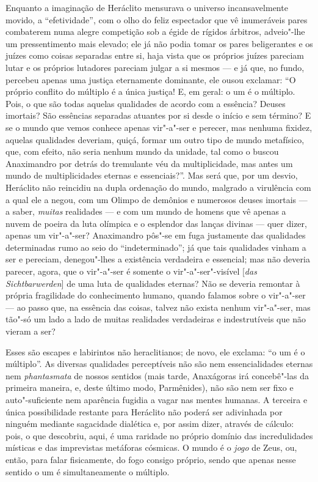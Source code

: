 Enquanto a imaginação de Heráclito mensurava o universo incansavelmente
movido, a ``efetividade'', com o olho do feliz espectador que vê inumeráveis
pares combaterem numa alegre competição sob a égide de rígidos árbitros,
adveio"-lhe um pressentimento mais elevado; ele já não podia tomar os pares
beligerantes e os juízes como coisas separadas entre si, haja vista que os
próprios juízes pareciam lutar e os próprios lutadores pareciam julgar a si
mesmos --- e já que, no fundo, percebeu apenas uma justiça eternamente
dominante, ele ousou exclamar: ``O próprio conflito do múltiplo é a única
justiça! E, em geral: o um é o múltiplo. Pois, o que são todas aquelas
qualidades de acordo com a essência? Deuses imortais? São essências separadas
atuantes por si desde o início e sem término? E se o mundo que vemos conhece
apenas vir"-a"-ser e perecer, mas nenhuma fixidez, aquelas qualidades
deveriam, quiçá, formar um outro tipo de mundo metafísico, que, com efeito,
não seria nenhum mundo da unidade, tal como o buscou Anaximandro por detrás
do tremulante véu da multiplicidade, mas antes um mundo de multiplicidades
eternas e essenciais?''. Mas será que, por um desvio, Heráclito não reincidiu
na dupla ordenação do mundo, malgrado a virulência com a qual ele a negou,
com um Olimpo de demônios e numerosos deuses imortais --- a saber, \textit{muitas} 
realidades --- e com um mundo de homens que vê apenas a nuvem de
poeira da luta olímpica e o esplendor das lanças divinas --- quer dizer,
apenas um vir"-a"-ser? Anaximandro pôs"-se em fuga justamente das qualidades
determinadas rumo ao seio do ``indeterminado''; já que tais qualidades vinham
a ser e pereciam, denegou"-lhes a existência verdadeira e essencial; mas não
deveria parecer, agora, que o vir"-a"-ser é somente o vir"-a"-ser"-visível
[\textit{das} \textit{Sichtbarwerden}] de uma luta de qualidades eternas? Não
se deveria remontar à própria fragilidade do conhecimento humano, quando
falamos sobre o vir"-a"-ser --- ao passo que, na essência das coisas, talvez
não exista nenhum vir"-a"-ser, mas tão"-só um lado a lado de muitas
realidades verdadeiras e indestrutíveis que não vieram a ser?

Esses são escapes e labirintos não heraclitianos; de novo, ele exclama: ``o um
é o múltiplo''. As diversas qualidades perceptíveis não são nem
essencialidades eternas nem \textit{phantasmata} de nossos sentidos
(mais tarde, Anaxágoras irá concebê"-las da primeira maneira, e, deste último
modo, Parmênides), não são nem ser fixo e auto"-suficiente nem aparência
fugidia a vagar nas mentes humanas. A terceira e única possibilidade restante
para Heráclito não poderá ser adivinhada por ninguém mediante sagacidade
dialética e, por assim dizer, através de cálculo: pois, o que descobriu,
aqui, é uma raridade no próprio domínio das incredulidades místicas e das
imprevistas metáforas cósmicas. O mundo é o \textit{jogo} de Zeus, ou, então,
para falar fisicamente, do fogo consigo próprio, sendo que apenas nesse
sentido o um é simultaneamente o múltiplo. 

